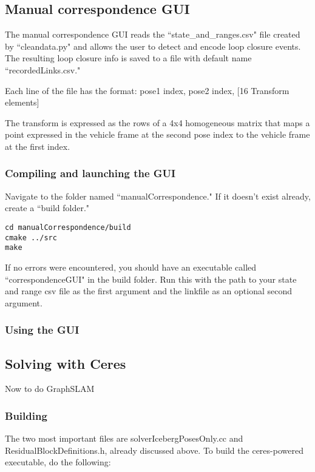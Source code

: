 \documentclass[12pt]{amsart}
\begin{document}
\subsection{Manual correspondence GUI}

The manual correspondence GUI reads the ``state\_and\_ranges.csv" file created by ``cleandata.py" and allows the user to detect and encode loop closure events. The resulting loop closure info is saved to a file with default name ``recordedLinks.csv." 

Each line of the file has the format:
pose1 index, pose2 index, [16 Transform elements]

The transform is expressed as the rows of a 4x4 homogeneous matrix that maps a point expressed in the vehicle frame at the second pose index to the vehicle frame at the first index.

\subsubsection{Compiling and launching the GUI}

Navigate to the folder named ``manualCorrespondence." If it doesn't exist already, create a ``build folder."

\begin{lstlisting}
cd manualCorrespondence/build
cmake ../src
make
\end{lstlisting} 

If no errors were encountered, you should have an executable called ``correspondenceGUI" in the build folder. Run this with the path to your state and range csv file as the first argument and the linkfile as an optional second argument.

\subsubsection{Using the GUI}



\subsection{Solving with Ceres}
Now to do GraphSLAM
\subsubsection{Building}

The two most important files are solverIcebergPosesOnly.cc and ResidualBlockDefinitions.h, already discussed above. To build the ceres-powered executable, do the following:
\end{document}
